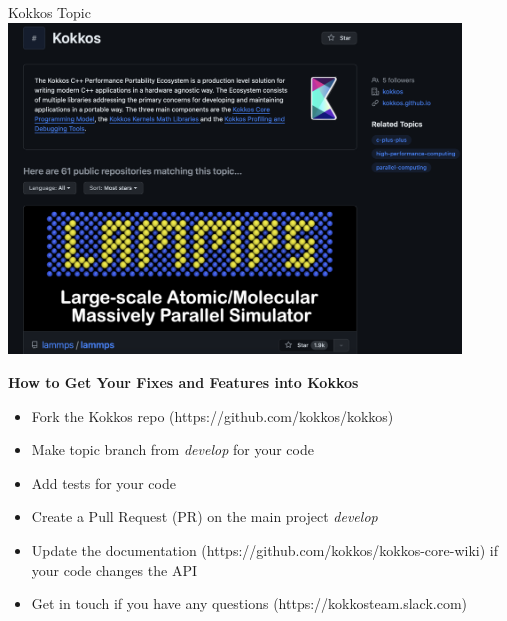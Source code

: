 \begin{frame}[fragile]{Kokkos Topic}
  \includegraphics[width=0.9\textwidth]{4_3/kokkos-topic}
\end{frame}




















\begin{frame}[fragile]

  \vspace{10pt}

  \textbf{How to Get Your Fixes and Features into Kokkos}
  \newline
  \begin{itemize}
    \item Fork the Kokkos repo (https://github.com/kokkos/kokkos)
    \item Make topic branch from \textit{develop} for your code
    \item Add tests for your code
    \item Create a Pull Request (PR) on the main project \textit{develop}
    \item Update the documentation (https://github.com/kokkos/kokkos-core-wiki) if your code changes the API
    \item Get in touch if you have any questions (https://kokkosteam.slack.com)
  \end{itemize}

\end{frame}



